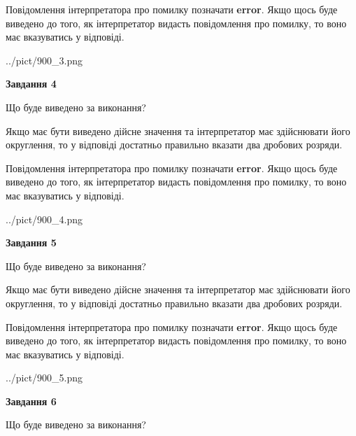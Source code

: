 \documentclass[12pt, ukrainian]{article}
\begin{document}
{\begin {Large}
Повідомлення інтерпретатора про помилку позначати \textbf{error}.
Якщо щось буде виведено до того, як інтерпретатор видасть повідомлення про помилку, 
то воно має вказуватись у відповіді. \par

\begin{center}
	{../pict/900_3.png}
\end{center}
\newpage

{\begin {center}\textbf{Завдання 4}\end {center}}\par
Що буде виведено за виконання? \par

Якщо має бути виведено дійсне значення та інтерпретатор має здійснювати його округлення, 
то у відповіді достатньо правильно вказати два дробових розряди.

Повідомлення інтерпретатора про помилку позначати \textbf{error}.
Якщо щось буде виведено до того, як інтерпретатор видасть повідомлення про помилку, 
то воно має вказуватись у відповіді. \par

\begin{center}
	{../pict/900_4.png}
\end{center}
\newpage

{\begin {center}\textbf{Завдання 5}\end {center}}\par
Що буде виведено за виконання? \par

Якщо має бути виведено дійсне значення та інтерпретатор має здійснювати його округлення, 
то у відповіді достатньо правильно вказати два дробових розряди.

Повідомлення інтерпретатора про помилку позначати \textbf{error}.
Якщо щось буде виведено до того, як інтерпретатор видасть повідомлення про помилку, 
то воно має вказуватись у відповіді. \par

\begin{center}
	{../pict/900_5.png}
\end{center}
\newpage

{\begin {center}\textbf{Завдання 6}\end {center}}\par
Що буде виведено за виконання? \par


\end{Large}}
\end{document}
